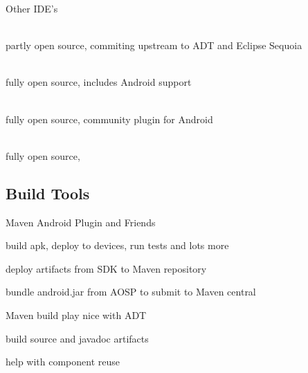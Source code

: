 \documentclass[aspectratio=169]{beamer}
\newcommand{\surl}[1] {{\tiny \url{#1}}}
\begin{document}
    \begin{frame}{Other IDE's}
      \begin{description}
        \item<1->[Motorola Motodev Studio for Android \surl{http://developer.motorola.com/docstools/motodevstudio/}] \hfill \\  partly open source, commiting upstream to ADT and Eclipse Sequoia 
        \item<2->[Jetbrains IntelliJ IDEA CE \surl{http://www.jetbrains.org/}] \hfill \\ fully open source, includes Android support 
        \item<3->[Oracle Netbeans \surl{http://kenai.com/projects/nbandroid/}] \hfill \\ fully open source, community plugin for Android 
        \item<4->[Emacs \surl{http://gitorious.org/emacs-android-minor-mode}] \hfill \\ fully open source, 
      \end{description}
    \end{frame}

  \subsection{Build Tools}

    \begin{frame}{Maven Android Plugin and Friends}
      \begin{description}
       \item<1->[Maven Android Plugin \surl{http://code.google.com/p/maven-android-plugin/}] build apk, deploy to devices, run tests and lots more
       \item<2->[Maven Android SDK Deployer \surl{https://github.com/mosabua/maven-android-sdk-deployer}] deploy artifacts from SDK to Maven repository
       \item<3->[Android4Maven \surl{http://sourceforge.net/projects/android4maven/}] bundle android.jar from AOSP to submit to Maven central
       \item<4->[M2E Android \surl{https://github.com/rgladwell/m2e-android}] Maven build play nice with ADT
       \item<5->[AndroidSDKFido \surl{https://github.com/joakime/android-sdkfido}] build source and javadoc artifacts
       \item<6->[Android RIndirect \surl{https://github.com/akquinet/android-rindirect}] help with component reuse
      \end{description}
    \end{frame}
\end{document}
